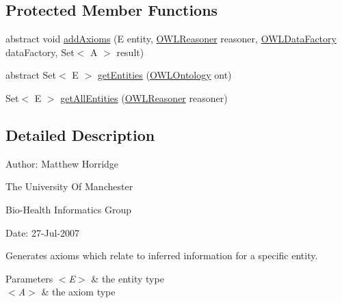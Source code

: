 \subsection*{Protected Member Functions}
\begin{DoxyCompactItemize}
\item 
abstract void \hyperlink{classorg_1_1semanticweb_1_1owlapi_1_1util_1_1_inferred_entity_axiom_generator_3_01_e_01extends_0ddbb3a27179f13f242fcbe2b6c7938c1_a52e282e20a8682397663d754e4664827}{add\-Axioms} (E entity, \hyperlink{interfaceorg_1_1semanticweb_1_1owlapi_1_1reasoner_1_1_o_w_l_reasoner}{O\-W\-L\-Reasoner} reasoner, \hyperlink{interfaceorg_1_1semanticweb_1_1owlapi_1_1model_1_1_o_w_l_data_factory}{O\-W\-L\-Data\-Factory} data\-Factory, Set$<$ A $>$ result)
\item 
abstract Set$<$ E $>$ \hyperlink{classorg_1_1semanticweb_1_1owlapi_1_1util_1_1_inferred_entity_axiom_generator_3_01_e_01extends_0ddbb3a27179f13f242fcbe2b6c7938c1_a2ef0f5bc94b828ae9908a97e9e4add09}{get\-Entities} (\hyperlink{interfaceorg_1_1semanticweb_1_1owlapi_1_1model_1_1_o_w_l_ontology}{O\-W\-L\-Ontology} ont)
\item 
Set$<$ E $>$ \hyperlink{classorg_1_1semanticweb_1_1owlapi_1_1util_1_1_inferred_entity_axiom_generator_3_01_e_01extends_0ddbb3a27179f13f242fcbe2b6c7938c1_a2d4c6c4a82763913e347ad38e6d0513e}{get\-All\-Entities} (\hyperlink{interfaceorg_1_1semanticweb_1_1owlapi_1_1reasoner_1_1_o_w_l_reasoner}{O\-W\-L\-Reasoner} reasoner)
\end{DoxyCompactItemize}


\subsection{Detailed Description}
Author\-: Matthew Horridge\par
 The University Of Manchester\par
 Bio-\/\-Health Informatics Group\par
 Date\-: 27-\/\-Jul-\/2007\par
\par
 Generates axioms which relate to inferred information for a specific entity. 
\begin{DoxyParams}{Parameters}
{\em $<$\-E$>$} & the entity type \\
\hline
{\em $<$\-A$>$} & the axiom type \\
\hline
\end{DoxyParams}


